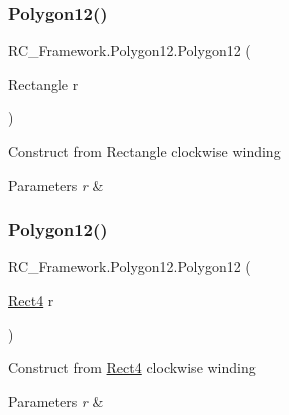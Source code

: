 \subsubsection{\texorpdfstring{Polygon12()}{Polygon12()}\hspace{0.1cm}{\footnotesize\ttfamily [2/5]}}
{\footnotesize\ttfamily R\+C\+\_\+\+Framework.\+Polygon12.\+Polygon12 (\begin{DoxyParamCaption}\item[{Rectangle}]{r }\end{DoxyParamCaption})}



Construct from Rectangle clockwise winding 


\begin{DoxyParams}{Parameters}
{\em r} & \\
\hline
\end{DoxyParams}
\mbox{\label{class_r_c___framework_1_1_polygon12_ac40541254b4ea029af66289a6657086e}} 
\subsubsection{\texorpdfstring{Polygon12()}{Polygon12()}\hspace{0.1cm}{\footnotesize\ttfamily [3/5]}}
{\footnotesize\ttfamily R\+C\+\_\+\+Framework.\+Polygon12.\+Polygon12 (\begin{DoxyParamCaption}\item[{\mbox{\hyperlink{class_r_c___framework_1_1_rect4}{Rect4}}}]{r }\end{DoxyParamCaption})}



Construct from \mbox{\hyperlink{class_r_c___framework_1_1_rect4}{Rect4}} clockwise winding 


\begin{DoxyParams}{Parameters}
{\em r} & \\
\hline
\end{DoxyParams}
\mbox{\label{class_r_c___framework_1_1_polygon12_a6f19bbead12cf9ee65458f023de697d2}} 
